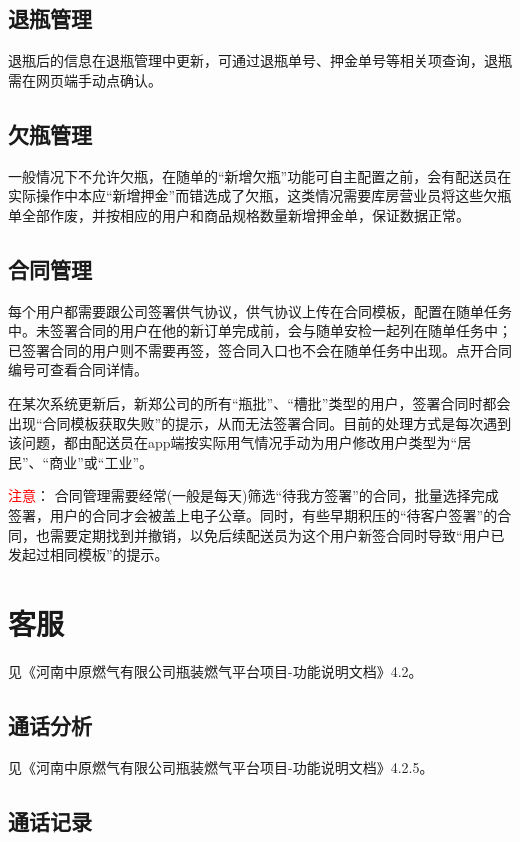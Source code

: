 \documentclass[UTF8]{ctexart}
\begin{document}
\subsection{退瓶管理}

退瓶后的信息在退瓶管理中更新，可通过退瓶单号、押金单号等相关项查询，退瓶需在网页端手动点确认。

\subsection{欠瓶管理}

一般情况下不允许欠瓶，在随单的“新增欠瓶”功能可自主配置之前，会有配送员在实际操作中本应“新增押金”而错选成了欠瓶，这类情况需要库房营业员将这些欠瓶单全部作废，并按相应的用户和商品规格数量新增押金单，保证数据正常。

\subsection{合同管理}

每个用户都需要跟公司签署供气协议，供气协议上传在合同模板，配置在随单任务中。未签署合同的用户在他的新订单完成前，会与随单安检一起列在随单任务中；已签署合同的用户则不需要再签，签合同入口也不会在随单任务中出现。点开合同编号可查看合同详情。

在某次系统更新后，新郑公司的所有“瓶批”、“槽批”类型的用户，签署合同时都会出现“合同模板获取失败”的提示，从而无法签署合同。目前的处理方式是每次遇到该问题，都由配送员在app端按实际用气情况手动为用户修改用户类型为“居民”、“商业”或“工业”。

\textcolor{red}{注意}：
合同管理需要经常(一般是每天)筛选“待我方签署”的合同，批量选择完成签署，用户的合同才会被盖上电子公章。同时，有些早期积压的“待客户签署”的合同，也需要定期找到并撤销，以免后续配送员为这个用户新签合同时导致“用户已发起过相同模板”的提示。



\section{客服}

见《河南中原燃气有限公司瓶装燃气平台项目-功能说明文档》4.2。

\subsection{通话分析}

见《河南中原燃气有限公司瓶装燃气平台项目-功能说明文档》4.2.5。


\subsection{通话记录}
\end{document}
